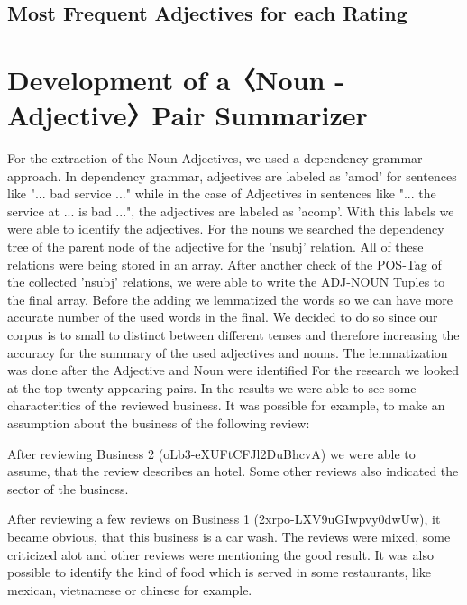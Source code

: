 \documentclass[sigchi]{acmart}
\begin{document}
	\subsection{Most Frequent Adjectives for each Rating}
	\section{Development of a〈Noun - Adjective〉Pair Summarizer}
	For the extraction of the Noun-Adjectives, we used a dependency-grammar approach. In dependency grammar, adjectives are labeled as 'amod' for sentences like "... bad service ..." while in the case of Adjectives in sentences like "... the service at ... is bad ...", the adjectives are labeled as 'acomp'. With this labels we were able to identify the adjectives. For the nouns we searched the dependency tree of the parent node of the adjective for 
	the 'nsubj' relation. All of these relations were being stored in an array. After another check of the POS-Tag of the collected 'nsubj' relations, we were able to write the ADJ-NOUN Tuples to the final array. Before the adding we lemmatized the words so we can have more accurate number of the used words in the final. We decided to do so since our corpus is to small to distinct between different tenses and therefore increasing the accuracy for the summary of the used adjectives and nouns. The lemmatization was done after the Adjective and Noun were identified For the research we looked at the top twenty appearing pairs.
	In the results we were able to see some characteritics of the reviewed business. It  was possible for example, to make an assumption about the business of the following review:

	After reviewing Business 2 (oLb3-eXUFtCFJl2DuBhcvA)  we were able to assume, that the review describes an hotel. Some other reviews also indicated the sector of the business. 

	After reviewing a few reviews on Business 1 (2xrpo-LXV9uGIwpvy0dwUw), it became obvious, that this business is a car wash. The reviews were mixed, some criticized alot and other reviews were mentioning the good result.  
	It was also possible to identify the kind of food which is served in some restaurants, like mexican, vietnamese or chinese for example.

	
	
\end{document}

